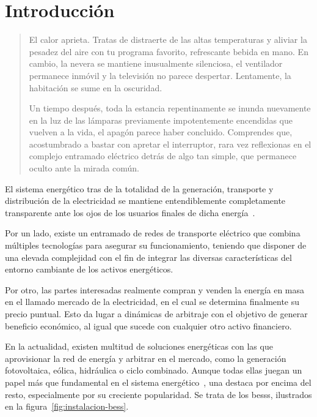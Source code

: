 
\cleardoublepage%

\chapter{Introducción}%
\label{makereference1}

\begin{quotation} \em

  El calor aprieta. Tratas de distraerte de las altas temperaturas y aliviar la pesadez del aire con tu programa favorito, refrescante bebida en mano. En cambio, la nevera se mantiene inusualmente silenciosa, el ventilador permanece inmóvil y la televisión no parece despertar. Lentamente, la habitación se sume en la oscuridad.

  Un tiempo después, toda la estancia repentinamente se inunda nuevamente en la luz de las lámparas previamente impotentemente encendidas que vuelven a la vida, el apagón parece haber concluido. Comprendes que, acostumbrado a bastar con apretar el interruptor, rara vez reflexionas en el complejo entramado eléctrico detrás de algo tan simple, que permanece oculto ante la mirada común.

\end{quotation}

El sistema energético tras de la totalidad de la generación, transporte y distribución de la electricidad se mantiene entendiblemente completamente transparente ante los ojos de los usuarios finales de dicha energía~\cite{garrues2009red}.

Por un lado, existe un entramado de redes de transporte eléctrico que combina múltiples tecnologías para asegurar su funcionamiento, teniendo que disponer de una elevada complejidad con el fin de integrar las diversas características del entorno cambiante de los activos energéticos.

Por otro, las partes interesadas realmente compran y venden la energía en masa en el llamado mercado de la electricidad, en el cual se determina finalmente su precio puntual. Esto da lugar a dinámicas de arbitraje con el objetivo de generar beneficio económico, al igual que sucede con cualquier otro activo financiero.

En la actualidad, existen multitud de soluciones energéticas con las que aprovisionar la red de energía y arbitrar en el mercado, como la generación fotovoltaica, eólica, hidráulica o ciclo combinado. Aunque todas ellas juegan un papel más que fundamental en el sistema energético~\cite{turkenburg2000renewable}, una destaca por encima del resto, especialmente por su creciente popularidad. Se trata de los \glspl{bess}, ilustrados en la figura~\ref{fig:instalacion-bess}.


